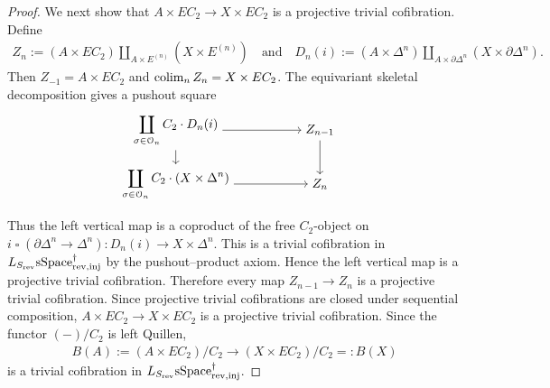 \documentclass[a4paper,dvipdfmx,11pt]{amsart}
\begin{document}
\begin{proof}
  We next show that $A \times EC_{2} \to X \times EC_{2}$ is a projective trivial cofibration.
  Define
  \begin{align}
    Z_n
    :=
    (A\times EC_2)
    \amalg_{A\times E^{(n)}}
    (X\times E^{(n)})
    \quad \text{and} \quad
    D_n(i)
    :=
    (A\times\Delta^n)
      \amalg_{A\times\partial\Delta^n}
    (X\times\partial\Delta^n).
  \end{align}
  Then $Z_{-1}=A\times EC_2$ and $\operatorname*{colim}_nZ_n=X\times EC_2$.
  The equivariant skeletal decomposition gives a pushout square
  \begin{align}
    &\begin{tikzpicture}[auto]
      \node (attaching-domain) at (0,1.5) {$\displaystyle
        \coprod_{\sigma\in\calO_n}
        C_2\mathbin{\cdot}D_n(i)$};
      \node (previous-stage) at (4,1.5) {$Z_{n-1}$};
      \node (attaching-codomain) at (0,0) {$\displaystyle
        \coprod_{\sigma\in\calO_n}
        C_2\mathbin{\cdot}(X\times\Delta^n)$};
      \node (stage) at (4,0) {$Z_n$};
      \draw[->]
        (attaching-domain) -- (previous-stage);
      \draw[->]
        (attaching-domain) -- (attaching-codomain);
      \draw[->]
        (previous-stage) -- (stage);
      \draw[->]
        (attaching-codomain) -- (stage);
    \end{tikzpicture}
  \end{align}
  Thus the left vertical map is a coproduct of the free $C_2$-object on $i\mathbin{\square}(\partial\Delta^n\to\Delta^n):D_n(i) \to X\times\Delta^n$.
  This is a trivial cofibration in $L_{S_{\mathrm{rev}}}\mathrm{sSpace}^{\dag}_{\mathrm{rev},\mathrm{inj}}$ by the pushout--product axiom.
  Hence the left vertical map is a projective trivial cofibration.
  Therefore every map $Z_{n-1}\to Z_n$ is a projective trivial cofibration.
  Since projective trivial cofibrations are closed under sequential composition, $A\times EC_2 \to X\times EC_2$ is a projective trivial cofibration.
  Since the functor $(-)/C_{2}$ is left Quillen, 
  \begin{align}
    B(A) := (A\times EC_2)/C_{2} \to (X\times EC_2)/C_{2} =: B(X)
  \end{align}
  is a trivial cofibration in $L_{S_{\mathrm{rev}}}\mathrm{sSpace}^{\dag}_{\mathrm{rev},\mathrm{inj}}$.


\end{proof}
\end{document}
